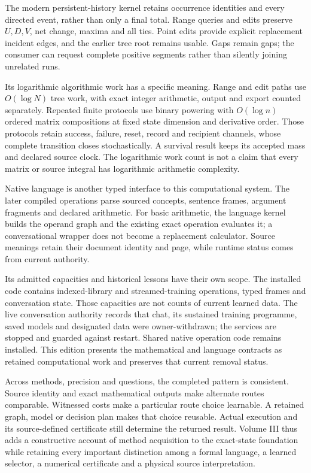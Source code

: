 The modern persistent-history kernel retains occurrence identities and every directed event, rather than only a final total. Range queries and edits preserve $U,D,V$, net change, maxima and all ties. Point edits provide explicit replacement incident edges, and the earlier tree root remains usable. Gaps remain gaps; the consumer can request complete positive segments rather than silently joining unrelated runs.

Its logarithmic algorithmic work has a specific meaning. Range and edit paths use $O(\log N)$ tree work, with exact integer arithmetic, output and export counted separately. Repeated finite protocols use binary powering with $O(\log n)$ ordered matrix compositions at fixed state dimension and derivative order. Those protocols retain success, failure, reset, record and recipient channels, whose complete transition closes stochastically. A survival result keeps its accepted mass and declared source clock. The logarithmic work count is not a claim that every matrix or source integral has logarithmic arithmetic complexity.

Native language is another typed interface to this computational system. The later compiled operations parse sourced concepts, sentence frames, argument fragments and declared arithmetic. For basic arithmetic, the language kernel builds the operand graph and the existing exact operation evaluates it; a conversational wrapper does not become a replacement calculator. Source meanings retain their document identity and page, while runtime status comes from current authority.

Its admitted capacities and historical lessons have their own scope. The installed code contains indexed-library and streamed-training operations, typed frames and conversation state. Those capacities are not counts of current learned data. The live conversation authority records that chat, its sustained training programme, saved models and designated data were owner-withdrawn; the services are stopped and guarded against restart. Shared native operation code remains installed. This edition presents the mathematical and language contracts as retained computational work and preserves that current removal status.

Across methods, precision and questions, the completed pattern is consistent. Source identity and exact mathematical outputs make alternate routes comparable. Witnessed costs make a particular route choice learnable. A retained graph, model or decision plan makes that choice reusable. Actual execution and its source-defined certificate still determine the returned result. Volume III thus adds a constructive account of method acquisition to the exact-state foundation while retaining every important distinction among a formal language, a learned selector, a numerical certificate and a physical source interpretation.
